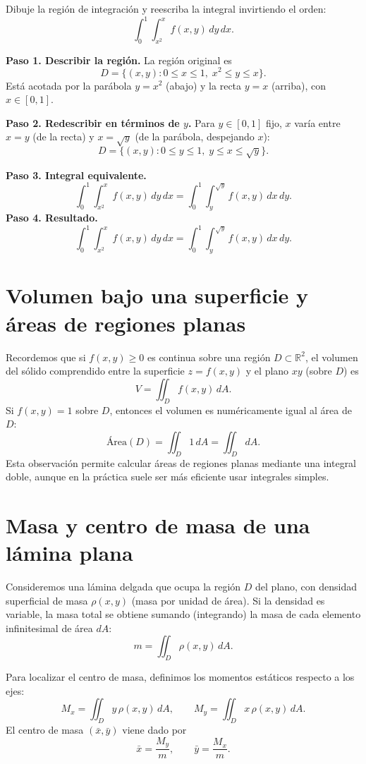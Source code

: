 \begin{prob}
Dibuje la región de integración y reescriba la integral invirtiendo el orden:
\[
\int_0^1\int_{x^2}^{x} f(x,y)\,dy\,dx.
\]
\begin{myproof}
\textbf{Paso 1. Describir la región.} La región original es
\[
D = \{(x,y): 0\le x\le 1,\; x^2\le y\le x\}.
\]
Está acotada por la parábola $y=x^2$ (abajo) y la recta $y=x$ (arriba), con $x\in[0,1]$.

\textbf{Paso 2. Redescribir en términos de $y$.} Para $y\in[0,1]$ fijo, $x$ varía entre $x=y$ (de la recta) y $x=\sqrt{y}$ (de la parábola, despejando $x$):
\[
D = \{(x,y): 0\le y\le 1,\; y\le x\le \sqrt{y}\}.
\]

\textbf{Paso 3. Integral equivalente.}
\[
\int_0^1\int_{x^2}^{x} f(x,y)\,dy\,dx = \int_0^1\int_{y}^{\sqrt{y}} f(x,y)\,dx\,dy.
\]
\textbf{Paso 4. Resultado.}
\[
\boxed{\int_0^1\int_{x^2}^{x} f(x,y)\,dy\,dx = \int_0^1\int_{y}^{\sqrt{y}} f(x,y)\,dx\,dy.}
\]
\end{myproof}
\end{prob}

\section{Volumen bajo una superficie y áreas de regiones planas}


Recordemos que si \(f(x,y)\ge 0\) es continua sobre una región \(D\subset\mathbb R^2\), el volumen del sólido comprendido entre la superficie \(z=f(x,y)\) y el plano \(xy\) (sobre \(D\)) es
\[
V = \iint_D f(x,y)\,dA.
\]
Si \(f(x,y)=1\) sobre \(D\), entonces el volumen es numéricamente igual al área de \(D\):
\[
\text{Área}(D)=\iint_D 1\,dA=\iint_D dA.
\]
Esta observación permite calcular áreas de regiones planas mediante una integral doble, aunque en la práctica suele ser más eficiente usar integrales simples.

\section{Masa y centro de masa de una lámina plana}

Consideremos una lámina delgada que ocupa la región \(D\) del plano, con densidad superficial de masa \(\rho(x,y)\) (masa por unidad de área). Si la densidad es variable, la masa total se obtiene sumando (integrando) la masa de cada elemento infinitesimal de área \(dA\):
\[
m = \iint_D \rho(x,y)\,dA.
\]

Para localizar el centro de masa, definimos los momentos estáticos respecto a los ejes:
\[
M_x = \iint_D y\,\rho(x,y)\,dA,\qquad
M_y = \iint_D x\,\rho(x,y)\,dA.
\]
El centro de masa \((\bar{x},\bar{y})\) viene dado por
\[
\bar{x} = \frac{M_y}{m}, \qquad \bar{y} = \frac{M_x}{m}.
\]

